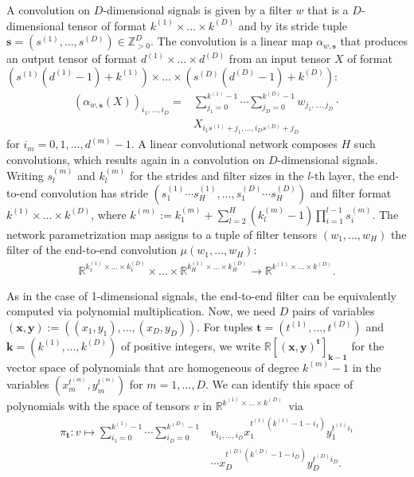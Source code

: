 \documentclass[twoside]{article}
\theoremstyle{definition}
\theoremstyle{remark}
\begin{document}
A convolution on $D$-dimensional signals is given by a filter $w$ that is a $D$-dimensional tensor of format $k^{(1)} \times \ldots \times k^{(D)}$ and by its stride tuple $\boldsymbol{s} = (s^{(1)}, \ldots, s^{(D)})\in \mathbb{Z}_{>0}^D$.
The convolution is a linear map $\alpha_{w,\boldsymbol{s}}$ that produces an output tensor of format $d^{(1)}\times \ldots \times d^{(D)}$ from an input tensor $X$ of format
$(s^{(1)}(d^{(1)}-1)+k^{(1)}) \times \ldots \times (s^{(D)}(d^{(D)}-1)+k^{(D)})$:
\begin{align}
\label{eq:higherDimensionalConvolution} 
    (\alpha_{w,\boldsymbol{s}}(X))_{i_1, \ldots, i_D}  =& 
    \textstyle \sum_{j_1=0}^{k^{(1)}-1} \cdots 
     \sum_{j_D=0}^{k^{(D)}-1}  
     w_{j_1,\ldots,j_D}  \cdot \nonumber \\ & X_{i_1s^{(1)}+j_1, \ldots, i_Ds^{(D)}+j_D}
\end{align}
for $i_m = 0,1,\ldots,d^{(m)}-1$.
A linear convolutional network composes $H$ such convolutions, which results again in a convolution on $D$-dimensional signals.
Writing $s^{(m)}_l$ and $k^{(m)}_l$ for the strides and filter sizes in the $l$-th layer, the end-to-end convolution
has stride $(s^{(1)}_1 \cdots s^{(1)}_H, \ldots, s^{(D)}_1 \cdots s^{(D)}_H)$ and filter format $k^{(1)} \times \ldots \times k^{(D)} $, where
$k^{(m)} := 
k^{(m)}_1 + \sum_{l=2}^H (k^{(m)}_{l}-1) \prod_{i=1}^{l-1} s^{(m)}_i$. 
The network parametrization map assigns to a tuple of filter tensors $(w_1, \ldots, w_H)$ the filter of the end-to-end convolution $\mu(w_1, \ldots, w_H)$:
\begin{align*}
       \mathbb{R}^{k_1^{(1)} \times \ldots \times k_1^{(D)}} \times \ldots \times \mathbb{R}^{k_H^{(1)} \times \ldots \times k_H^{(D)}} 
    \to
    \mathbb{R}^{k^{(1)} \times \ldots \times k^{(D)}}.
\end{align*}

As in the case of 1-dimensional signals, the end-to-end filter can be equivalently computed via polynomial multiplication. 
Now, we need $D$ pairs of variables $(\boldsymbol{x}, \boldsymbol{y}) := ((x_1,y_1), \ldots, (x_D, y_D))$.
For tuples $\boldsymbol{t} = (t^{(1)}, \ldots, t^{(D)})$
 and $\boldsymbol{k} = (k^{(1)}, \ldots, k^{(D)})$
of positive integers,
we write $\mathbb{R}[(\boldsymbol{x},\boldsymbol{y})^{\boldsymbol{t}}]_{\boldsymbol{k}-\boldsymbol{1}}$ for
the vector space of polynomials that are homogeneous of degree $k^{(m)}-1$ in the variables $(x_m^{t^{(m)}},y_m^{t^{(m)}})$ for $m = 1, \ldots, D$.
We can identify this space of polynomials with  the space of tensors $v$ in $\mathbb{R}^{k^{(1)}\times \ldots\times k^{(D)}}$~via
\begin{align*} 
     \pi_{\boldsymbol{t}}: v \mapsto \sum_{i_1=0}^{k^{(1)}-1} \cdots \sum_{i_D=0}^{k^{(D)}-1}
    & v_{i_1, \ldots, i_D} x_1^{t^{(1)} (k^{(1)}-1-i_1) }
    y_1^{t^{(1)} i_1} \\ &  \cdots x_D^{t^{(D)} (k^{(D)}-1-i_D) }y_D^{t^{(D)} i_D }.
\end{align*}
\end{document}
